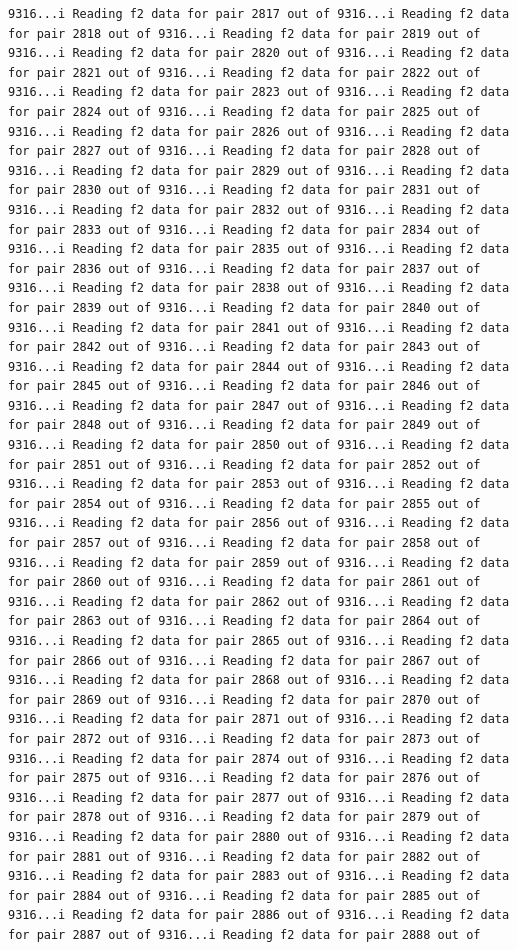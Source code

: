 \documentclass[
]{article}
\begin{document}
\begin{verbatim}
9316...i Reading f2 data for pair 2817 out of 9316...i Reading f2 data for pair 2818 out of 9316...i Reading f2 data for pair 2819 out of 9316...i Reading f2 data for pair 2820 out of 9316...i Reading f2 data for pair 2821 out of 9316...i Reading f2 data for pair 2822 out of 9316...i Reading f2 data for pair 2823 out of 9316...i Reading f2 data for pair 2824 out of 9316...i Reading f2 data for pair 2825 out of 9316...i Reading f2 data for pair 2826 out of 9316...i Reading f2 data for pair 2827 out of 9316...i Reading f2 data for pair 2828 out of 9316...i Reading f2 data for pair 2829 out of 9316...i Reading f2 data for pair 2830 out of 9316...i Reading f2 data for pair 2831 out of 9316...i Reading f2 data for pair 2832 out of 9316...i Reading f2 data for pair 2833 out of 9316...i Reading f2 data for pair 2834 out of 9316...i Reading f2 data for pair 2835 out of 9316...i Reading f2 data for pair 2836 out of 9316...i Reading f2 data for pair 2837 out of 9316...i Reading f2 data for pair 2838 out of 9316...i Reading f2 data for pair 2839 out of 9316...i Reading f2 data for pair 2840 out of 9316...i Reading f2 data for pair 2841 out of 9316...i Reading f2 data for pair 2842 out of 9316...i Reading f2 data for pair 2843 out of 9316...i Reading f2 data for pair 2844 out of 9316...i Reading f2 data for pair 2845 out of 9316...i Reading f2 data for pair 2846 out of 9316...i Reading f2 data for pair 2847 out of 9316...i Reading f2 data for pair 2848 out of 9316...i Reading f2 data for pair 2849 out of 9316...i Reading f2 data for pair 2850 out of 9316...i Reading f2 data for pair 2851 out of 9316...i Reading f2 data for pair 2852 out of 9316...i Reading f2 data for pair 2853 out of 9316...i Reading f2 data for pair 2854 out of 9316...i Reading f2 data for pair 2855 out of 9316...i Reading f2 data for pair 2856 out of 9316...i Reading f2 data for pair 2857 out of 9316...i Reading f2 data for pair 2858 out of 9316...i Reading f2 data for pair 2859 out of 9316...i Reading f2 data for pair 2860 out of 9316...i Reading f2 data for pair 2861 out of 9316...i Reading f2 data for pair 2862 out of 9316...i Reading f2 data for pair 2863 out of 9316...i Reading f2 data for pair 2864 out of 9316...i Reading f2 data for pair 2865 out of 9316...i Reading f2 data for pair 2866 out of 9316...i Reading f2 data for pair 2867 out of 9316...i Reading f2 data for pair 2868 out of 9316...i Reading f2 data for pair 2869 out of 9316...i Reading f2 data for pair 2870 out of 9316...i Reading f2 data for pair 2871 out of 9316...i Reading f2 data for pair 2872 out of 9316...i Reading f2 data for pair 2873 out of 9316...i Reading f2 data for pair 2874 out of 9316...i Reading f2 data for pair 2875 out of 9316...i Reading f2 data for pair 2876 out of 9316...i Reading f2 data for pair 2877 out of 9316...i Reading f2 data for pair 2878 out of 9316...i Reading f2 data for pair 2879 out of 9316...i Reading f2 data for pair 2880 out of 9316...i Reading f2 data for pair 2881 out of 9316...i Reading f2 data for pair 2882 out of 9316...i Reading f2 data for pair 2883 out of 9316...i Reading f2 data for pair 2884 out of 9316...i Reading f2 data for pair 2885 out of 9316...i Reading f2 data for pair 2886 out of 9316...i Reading f2 data for pair 2887 out of 9316...i Reading f2 data for pair 2888 out of 
\end{verbatim}
\end{document}
